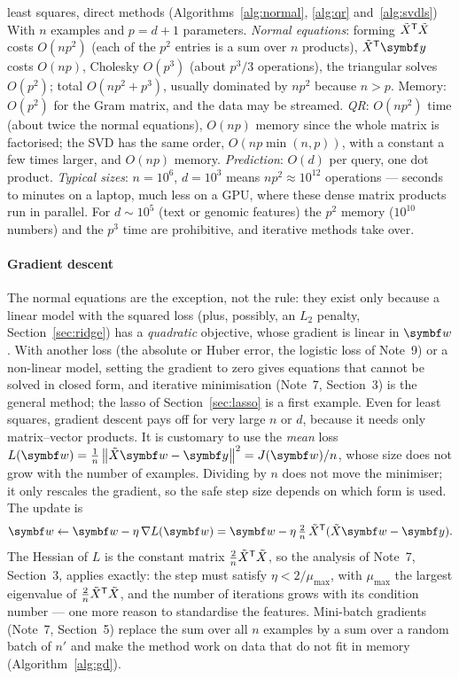 \documentclass[11pt]{article}
\newcommand{\Xt}{\tilde X}
\newcommand{\w}{\vect{w}}
\newcommand{\y}{\vect{y}}
\begin{document}
\begin{runtime}{least squares, direct methods (Algorithms~\ref{alg:normal}, \ref{alg:qr} and~\ref{alg:svdls})}
With $n$ examples and $p = d + 1$ parameters. \emph{Normal equations}: forming $\Xt\T\Xt$ costs $O(np^2)$ (each of the
$p^2$ entries is a sum over $n$ products), $\Xt\T\y$ costs $O(np)$, Cholesky $O(p^3)$ (about $p^3/3$ operations), the
triangular solves $O(p^2)$; total $O(np^2 + p^3)$, usually dominated by $np^2$ because $n > p$. Memory: $O(p^2)$ for the
Gram matrix, and the data may be streamed. \emph{QR}: $O(np^2)$ time (about twice the normal equations), $O(np)$ memory
since the whole matrix is factorised; the SVD has the same order, $O(np\min(n, p))$, with a constant a few times
larger, and $O(np)$ memory. \emph{Prediction}: $O(d)$ per query, one dot
product. \emph{Typical sizes}: $n = 10^6$, $d = 10^3$ means $np^2 \approx 10^{12}$ operations --- seconds to minutes on a
laptop, much less on a GPU, where these dense matrix products run in parallel. For $d \sim 10^5$ (text or genomic
features) the $p^2$ memory ($10^{10}$ numbers) and the $p^3$ time are prohibitive, and iterative methods take over.
\end{runtime}

\paragraph{Gradient descent} The normal equations are the exception, not the rule: they exist only because a linear
model with the squared loss (plus, possibly, an $L_2$ penalty, Section~\ref{sec:ridge}) has a \emph{quadratic}
objective, whose gradient is linear in $\w$. With another loss (the absolute or Huber error, the logistic loss of
Note~9) or a non-linear model, setting the gradient to zero gives equations that cannot be solved in closed form, and
iterative minimisation (Note~7, Section~3) is the general method; the lasso of Section~\ref{sec:lasso} is a first
example. Even for least squares, gradient descent pays off for very large $n$ or $d$, because it needs only
matrix--vector products. It is customary to use the \emph{mean} loss $L(\w) = \frac1n\norm{\Xt\w - \y}^2 = J(\w)/n$, whose size does not
grow with the number of examples. Dividing by $n$ does not move the minimiser; it only rescales the gradient, so the safe
step size depends on which form is used. The update is
\[
  \w \leftarrow \w - \eta\,\nabla L(\w) = \w - \eta\,\tfrac{2}{n}\,\Xt\T(\Xt\w - \y) .
\]
The Hessian of $L$ is the constant matrix $\frac2n\Xt\T\Xt$, so the analysis of Note~7, Section~3, applies exactly: the step must
satisfy $\eta < 2/\mu_{\max}$, with $\mu_{\max}$ the largest eigenvalue of $\frac2n\Xt\T\Xt$, and the number of
iterations grows with its condition number --- one more reason to standardise the features. Mini-batch gradients
(Note~7, Section~5) replace the sum over all $n$ examples by a sum over a random batch of $n'$ and make the method work
on data that do not fit in memory (Algorithm~\ref{alg:gd}).
\end{document}
